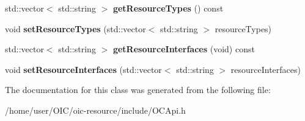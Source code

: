 \begin{DoxyCompactItemize}
\item 
\hypertarget{classOC_1_1OCRepresentation_ab0542e462d44e6b68df66ffc02adbc32}{}std\+::vector$<$ std\+::string $>$ {\bfseries get\+Resource\+Types} () const \label{classOC_1_1OCRepresentation_ab0542e462d44e6b68df66ffc02adbc32}

\item 
\hypertarget{classOC_1_1OCRepresentation_a8e5983f5bd9adc843afa1c589fe79648}{}void {\bfseries set\+Resource\+Types} (std\+::vector$<$ std\+::string $>$ resource\+Types)\label{classOC_1_1OCRepresentation_a8e5983f5bd9adc843afa1c589fe79648}

\item 
\hypertarget{classOC_1_1OCRepresentation_a0708c6898dc7c24065ec1ec3253d4e37}{}std\+::vector$<$ std\+::string $>$ {\bfseries get\+Resource\+Interfaces} (void) const \label{classOC_1_1OCRepresentation_a0708c6898dc7c24065ec1ec3253d4e37}

\item 
\hypertarget{classOC_1_1OCRepresentation_a038283e40c2c367fd7962fe521143d16}{}void {\bfseries set\+Resource\+Interfaces} (std\+::vector$<$ std\+::string $>$ resource\+Interfaces)\label{classOC_1_1OCRepresentation_a038283e40c2c367fd7962fe521143d16}

\end{DoxyCompactItemize}


The documentation for this class was generated from the following file\+:\begin{DoxyCompactItemize}
\item 
/home/user/\+O\+I\+C/oic-\/resource/include/O\+C\+Api.\+h\end{DoxyCompactItemize}
